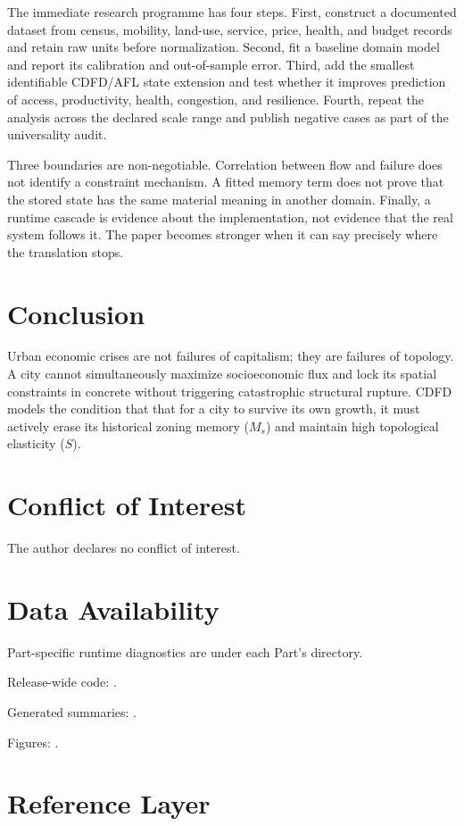 \documentclass[11pt,a4paper]{article}
\begin{document}
The immediate research programme has four steps. First, construct a documented
dataset from census, mobility, land-use, service, price, health, and budget records and retain raw units before normalization.
Second, fit a baseline domain model and report its calibration and out-of-sample
error. Third, add the smallest identifiable CDFD/AFL state extension and test
whether it improves prediction of access, productivity, health, congestion, and resilience. Fourth, repeat the
analysis across the declared scale range and publish negative cases as part of
the universality audit.

Three boundaries are non-negotiable. Correlation between flow and failure does
not identify a constraint mechanism. A fitted memory term does not prove that
the stored state has the same material meaning in another domain. Finally, a
runtime cascade is evidence about the implementation, not evidence that the
real system follows it. The paper becomes stronger when it can say precisely
where the translation stops.



\section{Conclusion}
Urban economic crises are not failures of capitalism; they are failures of topology. A city cannot simultaneously maximize socioeconomic flux and lock its spatial constraints in concrete without triggering catastrophic structural rupture. CDFD models the condition that that for a city to survive its own growth, it must actively erase its historical zoning memory ($M_s$) and maintain high topological elasticity ($S$).
\section*{Conflict of Interest} The author declares no conflict of interest.
\section*{Data Availability}
Part-specific runtime diagnostics are under each Part's  directory.

Release-wide code: .

Generated summaries: .

Figures: .


\section{Reference Layer}


\end{document}
